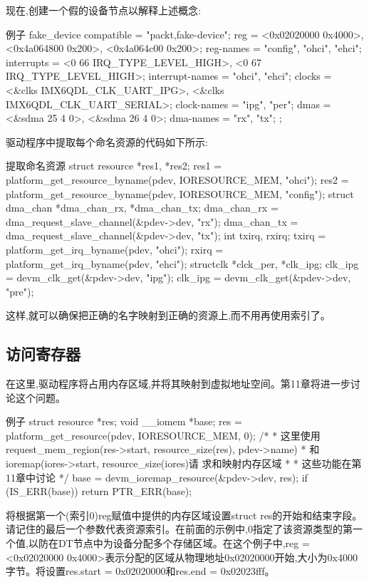 \documentclass[lang=cn,newtx,10pt,scheme=chinese]{elegantbook}
\begin{document}
现在,创建一个假的设备节点以解释上述概念:

\begin{mycode}{例子}
fake_device {
    compatible = "packt,fake-device";
    reg = <0x02020000 0x4000>, <0x4a064800 0x200>, <0x4a064c00 0x200>;
    reg-names = "config", "ohci", "ehci";
    interrupts = <0 66 IRQ_TYPE_LEVEL_HIGH>, <0 67 IRQ_TYPE_LEVEL_HIGH>;
    interrupt-names = "ohci", "ehci";
    clocks = <&clks IMX6QDL_CLK_UART_IPG>, <&clks IMX6QDL_CLK_UART_SERIAL>;
    clock-names = "ipg", "per";
    dmas = <&sdma 25 4 0>, <&sdma 26 4 0>;
    dma-names = "rx", "tx";
};
\end{mycode}

驱动程序中提取每个命名资源的代码如下所示:

\begin{mycode}{提取命名资源}
struct resource *res1, *res2;
res1 = platform_get_resource_byname(pdev, IORESOURCE_MEM, "ohci");
res2 = platform_get_resource_byname(pdev, IORESOURCE_MEM, "config");
struct dma_chan *dma_chan_rx, *dma_chan_tx;
dma_chan_rx = dma_request_slave_channel(&pdev->dev, "rx");
dma_chan_tx = dma_request_slave_channel(&pdev->dev, "tx");
int txirq, rxirq;
txirq = platform_get_irq_byname(pdev, "ohci");
rxirq = platform_get_irq_byname(pdev, "ehci");
structclk *clck_per, *clk_ipg;
clk_ipg = devm_clk_get(&pdev->dev, "ipg");
clk_ipg = devm_clk_get(&pdev->dev, "pre");
\end{mycode}

这样,就可以确保把正确的名字映射到正确的资源上,而不用再使用索引了。

\subsection{访问寄存器}

在这里,驱动程序将占用内存区域,并将其映射到虚拟地址空间。第11章将进一步讨论这个问题。

\begin{mycode}{例子}
struct resource *res;
void __iomem *base;
res = platform_get_resource(pdev, IORESOURCE_MEM, 0);
/*
* 这里使用request_mem_region(res->start,
resource_size(res), pdev->name)
* 和ioremap(iores->start, resource_size(iores)请
求和映射内存区域
*
* 这些功能在第11章中讨论
*/
base = devm_ioremap_resource(&pdev->dev, res);
if (IS_ERR(base))
    return PTR_ERR(base);
\end{mycode}

将根据第一个(索引0)reg赋值中提供的内存区域设置struct res的开始和结束字段。请记住的最后一个参数代表资源索引。在前面的示例中,0指定了该资源类型的第一个值,以防在DT节点中为设备分配多个存储区域。在这个例子中,reg = <0x02020000 0x4000>表示分配的区域从物理地址0x02020000开始,大小为0x4000字节。将设置res.start = 0x02020000和res.end = 0x02023fff。
\end{document}
